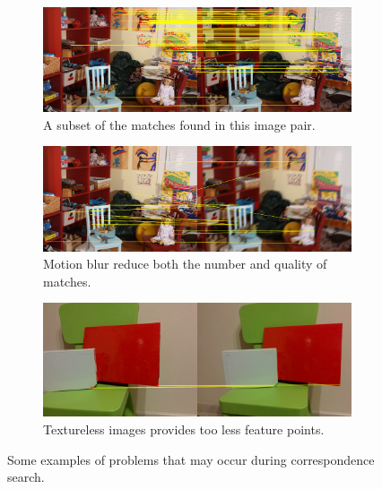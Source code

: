 \begin{figure}
	\centering
	\begin{subfigure}{\textwidth}
		\centering
		\includegraphics[width=\textwidth]{img/good_stereo}
		\caption{A subset of the matches found in this image pair.}\label{fig:good_stereo}
	\end{subfigure}
	\begin{subfigure}{\textwidth}
		\centering
		\includegraphics[width=\textwidth]{img/motion_blur}
		\caption{Motion blur reduce both the number and quality of matches.}\label{fig:motion_blur}
	\end{subfigure}
	\begin{subfigure}{\textwidth}
		\centering
		\includegraphics[width=\textwidth]{img/textureless_stereo}
		\caption{Textureless images provides too less feature points.}\label{fig:textureless}
	\end{subfigure}
	\caption{Some examples of problems that may occur during correspondence search.}\label{fig:matching_problems}
\end{figure}

